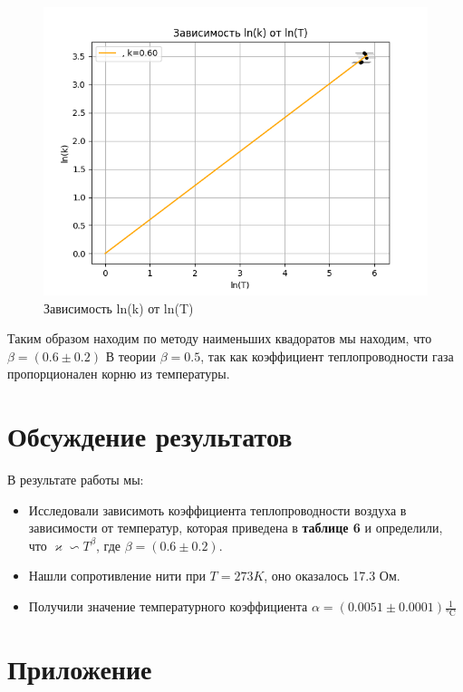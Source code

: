 \documentclass[a4paper, 10pt, twocolumn]{article}
\begin{document}
    \begin{figure}[H]
        \centering
        \includegraphics[width=1\linewidth]{graphs/figure7.png}
        \begin{center}
            \caption{Зависимость ln(k) от ln(T)}
        \end{center}
    \end{figure}

    Таким образом находим по методу наименьших квадоратов мы находим, что $\beta = (0.6 \pm 0.2)$ 
    В теории $ \beta = 0.5$, так как коэффициент теплопроводности газа пропорционален корню из температуры.
\section{Обсуждение результатов}
    В результате работы мы:
    \begin{itemize}
        \item Исследовали зависимоть коэффициента теплопроводности воздуха в зависимости от температур, которая
        приведена в \textbf{таблице 6} и определили, что $\varkappa \backsim T^\beta$, где $\beta = (0.6 \pm 0.2)$.

        \item Нашли сопротивление нити при $T = 273 K$, оно оказалось 17.3 Ом.

        \item Получили значение температурного коэффициента $\alpha = (0.0051 \pm 0.0001) \frac{1}{\text{°C}}$
    \end{itemize}
    \newpage
\onecolumn
\section{Приложение}
\end{document}
